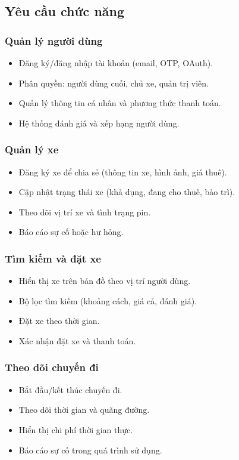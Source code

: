 \subsection{Yêu cầu chức năng}
\subsubsection*{Quản lý người dùng}
\begin{itemize}
    \item Đăng ký/đăng nhập tài khoản (email, OTP, OAuth).
    \item Phân quyền: người dùng cuối, chủ xe, quản trị viên.
    \item Quản lý thông tin cá nhân và phương thức thanh toán.
    \item Hệ thống đánh giá và xếp hạng người dùng.
\end{itemize}

\subsubsection*{Quản lý xe}
\begin{itemize}
    \item Đăng ký xe để chia sẻ (thông tin xe, hình ảnh, giá thuê).
    \item Cập nhật trạng thái xe (khả dụng, đang cho thuê, bảo trì).
    \item Theo dõi vị trí xe và tình trạng pin.
    \item Báo cáo sự cố hoặc hư hỏng.
\end{itemize}

\subsubsection*{Tìm kiếm và đặt xe}
\begin{itemize}
    \item Hiển thị xe trên bản đồ theo vị trí người dùng.
    \item Bộ lọc tìm kiếm (khoảng cách, giá cả, đánh giá).
    \item Đặt xe theo thời gian.
    \item Xác nhận đặt xe và thanh toán.
\end{itemize}

\subsubsection*{Theo dõi chuyến đi}
\begin{itemize}
    \item Bắt đầu/kết thúc chuyến đi.
    \item Theo dõi thời gian và quãng đường.
    \item Hiển thị chi phí thời gian thực.
    \item Báo cáo sự cố trong quá trình sử dụng.
\end{itemize}

